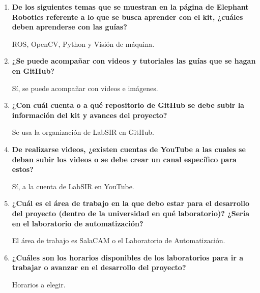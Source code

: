 \begin{enumerate}[label=\arabic*.]
    \item \textbf{De los siguientes temas que se muestran en la página de Elephant Robotics referente a lo que se busca aprender con el kit, ¿cuáles deben aprenderse con las guías?}
    
    ROS, OpenCV, Python y Visión de máquina.
    
    \item \textbf{¿Se puede acompañar con videos y tutoriales las guías que se hagan en GitHub?}
    
    Sí, se puede acompañar con videos e imágenes.
    
    \item \textbf{¿Con cuál cuenta o a qué repositorio de GitHub se debe subir la información del kit y avances del proyecto?}
    
    Se usa la organización de LabSIR en GitHub.
    
    \item \textbf{De realizarse videos, ¿existen cuentas de YouTube a las cuales se deban subir los videos o se debe crear un canal específico para estos?}
    
    Sí, a la cuenta de LabSIR en YouTube.
    
    \item \textbf{¿Cuál es el área de trabajo en la que debo estar para el desarrollo del proyecto (dentro de la universidad en qué laboratorio)? ¿Sería en el laboratorio de automatización?}
    
    El área de trabajo es SalaCAM o el Laboratorio de Automatización.
    
    \item \textbf{¿Cuáles son los horarios disponibles de los laboratorios para ir a trabajar o avanzar en el desarrollo del proyecto?}
    
    Horarios a elegir.
\end{enumerate}

